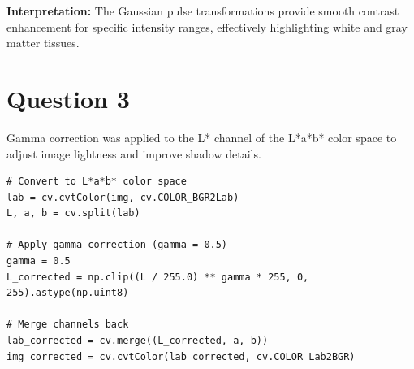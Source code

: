 \documentclass[10pt,a4paper]{article}
\begin{document}
\textbf{Interpretation:} The Gaussian pulse transformations provide smooth contrast enhancement for specific intensity ranges, effectively highlighting white and gray matter tissues.

\section{Question 3}
Gamma correction was applied to the L* channel of the L*a*b* color space to adjust image lightness and improve shadow details.

\begin{lstlisting}[caption=Gamma correction implementation]
# Convert to L*a*b* color space
lab = cv.cvtColor(img, cv.COLOR_BGR2Lab)
L, a, b = cv.split(lab)

# Apply gamma correction (gamma = 0.5)
gamma = 0.5
L_corrected = np.clip((L / 255.0) ** gamma * 255, 0, 255).astype(np.uint8)

# Merge channels back
lab_corrected = cv.merge((L_corrected, a, b))
img_corrected = cv.cvtColor(lab_corrected, cv.COLOR_Lab2BGR)

\end{lstlisting}
\end{document}
